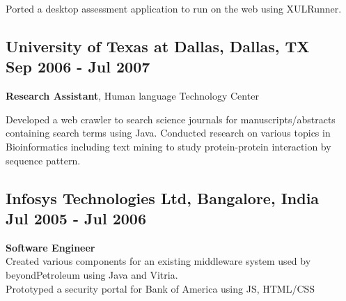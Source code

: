 \documentclass{article}
\begin{document}
\begin{minipage}[t]{3.8in}
      Ported a desktop assessment application to run on the web using XULRunner. 
      
      \subsection*{University of Texas at Dallas, Dallas, TX \\
      Sep 2006 - Jul 2007}
      
      {\bf Research Assistant}, Human language Technology Center
  
      Developed a web crawler to search science journals for manuscripts/abstracts containing search terms using Java. 
      Conducted research on various topics in Bioinformatics including text mining to study protein-protein interaction by sequence pattern. \\
      
      \subsection*{Infosys Technologies Ltd, Bangalore, India \\
      Jul 2005 - Jul 2006}
      
      {\bf Software Engineer} \\
      Created various components for an existing middleware system used by beyondPetroleum using Java and Vitria. \\
      Prototyped a security portal for Bank of America using JS, HTML/CSS
\end{minipage}
\hfill
\end{document}
